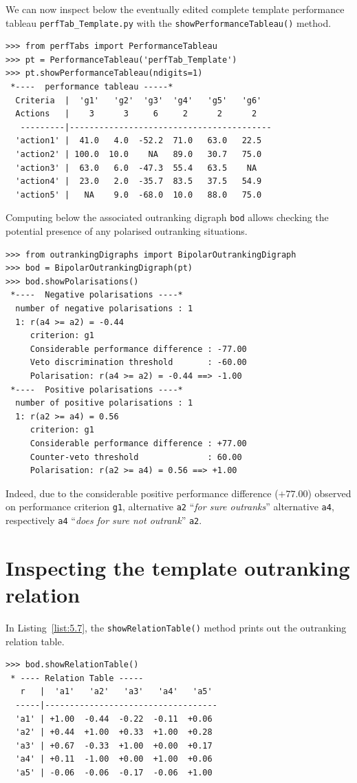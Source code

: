 We can now inspect below the eventually edited complete template performance tableau \texttt{perfTab\_Template.py} with the \texttt{showPerformanceTableau()} method.
\begin{lstlisting}
>>> from perfTabs import PerformanceTableau   
>>> pt = PerformanceTableau('perfTab_Template')
>>> pt.showPerformanceTableau(ndigits=1)
 *----  performance tableau -----*
  Criteria  |  'g1'   'g2'  'g3'  'g4'   'g5'   'g6'   
  Actions   |    3      3     6     2      2      2    
   ---------|-----------------------------------------
  'action1' |  41.0   4.0  -52.2  71.0   63.0   22.5  
  'action2' | 100.0  10.0    NA   89.0   30.7   75.0  
  'action3' |  63.0   6.0  -47.3  55.4   63.5    NA   
  'action4' |  23.0   2.0  -35.7  83.5   37.5   54.9  
  'action5' |   NA    9.0  -68.0  10.0   88.0   75.0
\end{lstlisting}

Computing below the associated outranking digraph \texttt{bod} allows checking the potential presence of any polarised outranking situations.
\begin{lstlisting}
>>> from outrankingDigraphs import BipolarOutrankingDigraph
>>> bod = BipolarOutrankingDigraph(pt)
>>> bod.showPolarisations()
 *----  Negative polarisations ----*
  number of negative polarisations : 1 
  1: r(a4 >= a2) = -0.44
     criterion: g1
     Considerable performance difference : -77.00
     Veto discrimination threshold       : -60.00
     Polarisation: r(a4 >= a2) = -0.44 ==> -1.00
 *----  Positive polarisations ----*
  number of positive polarisations : 1 
  1: r(a2 >= a4) = 0.56
     criterion: g1
     Considerable performance difference : +77.00
     Counter-veto threshold              : 60.00
     Polarisation: r(a2 >= a4) = 0.56 ==> +1.00
\end{lstlisting}

Indeed, due to the considerable positive performance difference ($+77.00$) observed on performance criterion \texttt{g1}, alternative \texttt{a2} ``\emph{for sure outranks}'' alternative \texttt{a4}, respectively \texttt{a4} ``\emph{does for sure not outrank}'' \texttt{a2}.

\section{Inspecting the template outranking relation}
\label{sec:5.6}

In Listing~\vref{list:5.7}, the \texttt{showRelationTable()} method prints out the outranking relation table.
\begin{lstlisting}[caption={The template outranking relation},label=list:5.7]
>>> bod.showRelationTable()
 * ---- Relation Table -----
   r   |  'a1'   'a2'   'a3'   'a4'   'a5'   
  -----|-----------------------------------
  'a1' | +1.00  -0.44  -0.22  -0.11  +0.06  
  'a2' | +0.44  +1.00  +0.33  +1.00  +0.28  
  'a3' | +0.67  -0.33  +1.00  +0.00  +0.17  
  'a4' | +0.11  -1.00  +0.00  +1.00  +0.06  
  'a5' | -0.06  -0.06  -0.17  -0.06  +1.00
\end{lstlisting}

